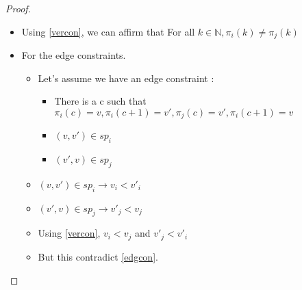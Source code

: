\begin{proof}
\begin{itemize}
  \item Using \ref{vercon}, we can affirm that For all $k\in \mathbb{N}, \pi_i(k) \not= \pi_j(k)$
  \item For the edge constraints.
  \begin{itemize}
    \item Let's assume we have an edge constraint :
    \begin{itemize}
      \item There is a c such that $\pi_i(c)=v, \pi_i(c+1)=v',\pi_j(c)=v', \pi_i(c+1)=v$
      \item $(v,v') \in sp_i$
      \item $(v',v) \in sp_j$
    \end{itemize}
    \item $(v,v') \in sp_i \rightarrow v_i < v'_i$
    \item $(v',v) \in sp_j \rightarrow v'_j < v_j$
    \item Using \ref{vercon}, $v_i < v_j$ and $v'_j < v'_i$
    \item But this contradict \ref{edgcon}.
  \end{itemize}
\end{itemize}

\end{proof}

